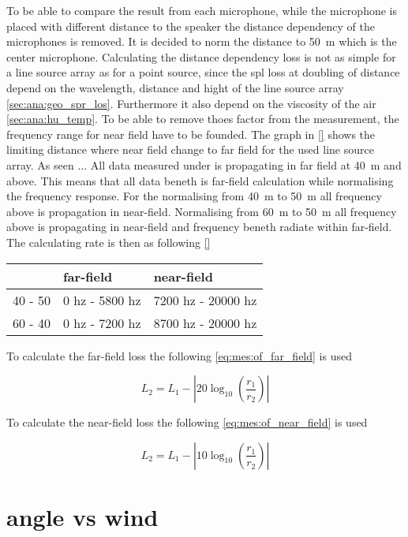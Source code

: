 To be able to compare the result from each microphone, while the microphone is placed with different distance to the speaker the distance dependency of the microphones is removed. It is decided to norm the distance to \SI{50}{\meter} which is the center microphone. Calculating the distance dependency loss is not as simple for a line source array as for a point source, since the \gls{spl} loss at doubling of distance depend on the wavelength, distance and hight of the line source array \autoref{sec:ana:geo_spr_los}. Furthermore it also depend on the viscosity of the air \autoref{sec:ana:hu_temp}. To be able to remove thoes factor from the measurement, the frequency range for near field have to be founded. The graph in \autoref{} shows the limiting distance where near field change to far field for the used line source array. As seen    ... All data measured under  is propagating in far field at \SI{40}{\meter} and above. This means that all data beneth  is far-field calculation while normalising the frequency response. For the normalising from \SI{40}{\meter} to \SI{50}{\meter} all frequency above  is propagation in near-field. Normalising from \SI{60}{\meter} to \SI{50}{\meter} all frequency above  is propagating in near-field and frequency beneth  radiate within far-field. The calculating rate is then as following \autoref{}

\begin{table}[H]
\begin{tabular}{l|ll}
        & far-field      & near-field         \\ \hline
40 - 50 & 0 hz - 5800 hz & 7200 hz - 20000 hz \\
60 - 40 & 0 hz - 7200 hz & 8700 hz - 20000 hz
\end{tabular}
\end{table}


To calculate the far-field loss the following \autoref{eq:mes:of_far_field} is used 

\begin{equation}\label{eq:mes:of_far_field}
L_2 = L_1-\left | 20 \log_{10}(\frac{r_1}{r_2}) \right |
\end{equation}

To calculate the near-field loss the following \autoref{eq:mes:of_near_field} is used 

\begin{equation}\label{eq:mes:of_near_field}
L_2 = L_1-\left | 10 \log_{10}(\frac{r_1}{r_2}) \right |
\end{equation}





\section{angle vs wind}\label{mes:kudo:relaton}